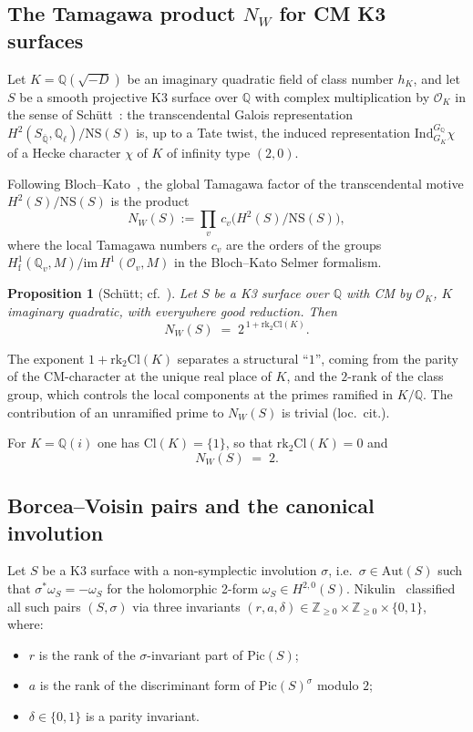 \documentclass[11pt,a4paper]{article}
\theoremstyle{plain}
\newtheorem{proposition}[theorem]{Proposition}
\theoremstyle{definition}
\newcommand{\Q}{\mathbb{Q}}
\newcommand{\Z}{\mathbb{Z}}
\newcommand{\OK}{\mathcal{O}_K}
\newcommand{\NS}{\mathrm{NS}}
\newcommand{\rk}{\mathrm{rk}}
\newcommand{\Cl}{\mathrm{Cl}}
\newcommand{\Pic}{\mathrm{Pic}}
\newcommand{\Aut}{\mathrm{Aut}}
\newcommand{\NW}{N_{W}}
\begin{document}
\subsection{The Tamagawa product $\NW$ for CM K3 surfaces}

Let $K=\Q(\sqrt{-D})$ be an imaginary quadratic field of class number
$h_{K}$, and let $S$ be a smooth projective K3 surface over $\Q$ with
complex multiplication by $\OK$ in the sense of
Sch\"utt~\cite{Schutt2009}: the transcendental Galois representation
$H^{2}(S_{\overline{\Q}},\Q_{\ell})/\NS(S)$ is, up to a Tate twist, the
induced representation $\mathrm{Ind}_{G_{K}}^{G_{\Q}}\chi$ of a Hecke
character $\chi$ of $K$ of infinity type $(2,0)$.

Following Bloch--Kato~\cite{BlochKato1990}, the global Tamagawa factor of
the transcendental motive $H^{2}(S)/\NS(S)$ is the product
\[
   \NW(S) := \prod_{v}\,c_{v}\bigl(H^{2}(S)/\NS(S)\bigr),
\]
where the local Tamagawa numbers $c_{v}$ are the orders of the groups
$H^{1}_{\mathrm{f}}(\Q_{v},M)/\mathrm{im}\,H^{1}(\mathcal O_{v},M)$ in the
Bloch--Kato Selmer formalism.

\begin{proposition}[Sch\"utt; cf.~\cite{Schutt2009,Schutt2008}]
\label{prop:NW-formula}
Let $S$ be a K3 surface over $\Q$ with CM by $\OK$, $K$ imaginary quadratic,
with everywhere good reduction. Then
\begin{equation}
\label{eq:NW-rk2}
   \NW(S) \;=\; 2^{\,1+\rk_{2}\Cl(K)}.
\end{equation}
\end{proposition}

The exponent $1+\rk_{2}\Cl(K)$ separates a structural ``$1$'', coming from
the parity of the CM-character at the unique real place of $K$, and the
$2$-rank of the class group, which controls the local components at the
primes ramified in $K/\Q$. The contribution of an unramified prime to
$\NW(S)$ is trivial (loc.~cit.).

For $K=\Q(i)$ one has $\Cl(K)=\{1\}$, so that $\rk_{2}\Cl(K)=0$ and
\begin{equation}
\label{eq:NW-Qi}
   \NW(S)\;=\;2.
\end{equation}

\subsection{Borcea--Voisin pairs and the canonical involution}

Let $S$ be a K3 surface with a non-symplectic involution $\sigma$, i.e.\
$\sigma\in\Aut(S)$ such that $\sigma^{*}\omega_{S}=-\omega_{S}$ for the
holomorphic 2-form $\omega_{S}\in H^{2,0}(S)$. Nikulin~\cite{Nikulin1979}
classified all such pairs $(S,\sigma)$ via three invariants
$(r,a,\delta)\in\Z_{\geq 0}\times\Z_{\geq 0}\times\{0,1\}$, where:
\begin{itemize}
\item $r$ is the rank of the $\sigma$-invariant part of $\Pic(S)$;
\item $a$ is the rank of the discriminant form of $\Pic(S)^{\sigma}$ modulo $2$;
\item $\delta\in\{0,1\}$ is a parity invariant.
\end{itemize}
\end{document}
